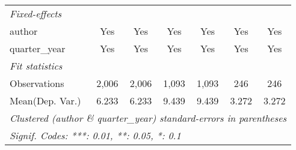 \begin{tabular}{lcccccc}
   \midrule
   \emph{Fixed-effects}\\
   author                                & Yes           & Yes           & Yes           & Yes           & Yes         & Yes\\  
   quarter\_year                         & Yes           & Yes           & Yes           & Yes           & Yes         & Yes\\  
   \midrule
   \emph{Fit statistics}\\
   Observations                          & 2,006         & 2,006         & 1,093         & 1,093         & 246         & 246\\  
Mean(Dep. Var.) & 6.233 & 6.233 & 9.439 & 9.439 & 3.272 & 3.272 \\
   \midrule \midrule
   \multicolumn{7}{l}{\emph{Clustered (author \& quarter\_year) standard-errors in parentheses}}\\
   \multicolumn{7}{l}{\emph{Signif. Codes: ***: 0.01, **: 0.05, *: 0.1}}\\
\end{tabular}
\par\endgroup
